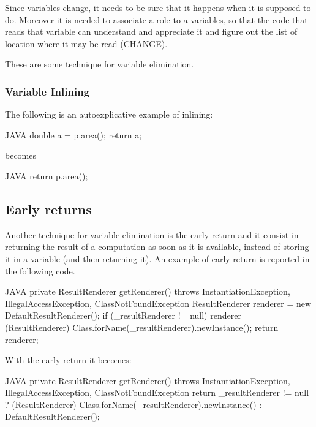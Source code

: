 Since variables change, it needs to be sure that it happens when it is supposed to do. Moreover it is needed to associate a role to a variables,
so that the code that reads that variable can understand and appreciate it and figure out the list of location where it may be read (CHANGE).

These are some technique for variable elimination.

\subsubsection{Variable Inlining}

The following is an autoexplicative example of inlining:

\begin{code}{JAVA}
double a = p.area();
return a; 
\end{code}

becomes

\begin{code}{JAVA}
return p.area();  
\end{code}

\subsection{Early returns} 

Another technique for variable elimination is the early return and it consist in returning the result of a computation
as soon as it is available, instead of storing it in a variable (and then returning it).
An example of early return is reported in the following code.
\begin{code}{JAVA}
private ResultRenderer getRenderer() throws InstantiationException, 
			    IllegalAccessException, ClassNotFoundException {
    ResultRenderer renderer = new DefaultResultRenderer();
    if (_resultRenderer != null)
        renderer = (ResultRenderer) Class.forName(_resultRenderer).newInstance();
    return renderer;
}
\end{code}
With the early return it becomes:
\begin{code}{JAVA}
private ResultRenderer getRenderer() throws InstantiationException,
                             IllegalAccessException, ClassNotFoundException {
    return _resultRenderer != null ? (ResultRenderer) 
        Class.forName(_resultRenderer).newInstance() : DefaultResultRenderer();
} 
\end{code}


